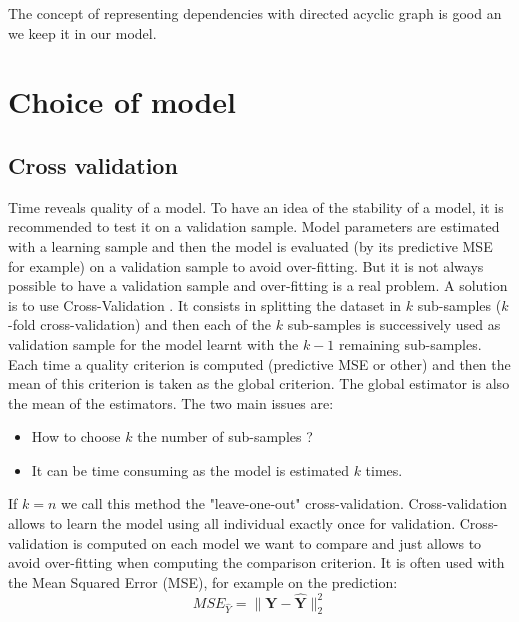 \documentclass[12pt,a4paper]{report}
\begin{document}
The concept of representing dependencies with directed acyclic graph is good an we keep it in our model.		
			
	

		\section{Choice of model}
			\subsection{Cross validation}
				
				Time reveals quality of a model. To have an idea of the stability of a model, it is recommended to test it on a validation sample. Model parameters are estimated with a learning sample and then the model is evaluated (by its predictive MSE for example) on a validation sample to avoid over-fitting. But it is not always possible to have a validation sample and over-fitting is a real problem. A solution is to use Cross-Validation \cite{kohavi1995study,arlot2010survey}. It consists in splitting the dataset in $k$ sub-samples ($k$-fold cross-validation) and then each of the $k$ sub-samples is successively used as validation sample for the model learnt with the $k-1$ remaining sub-samples. Each time a quality criterion  is computed (predictive MSE or other) and then the mean of this criterion is taken as the global criterion. The global estimator is also the mean of the estimators. The two main issues are:
				\begin{itemize}
					\item How to choose $k$ the number of sub-samples ?
					\item It can be time consuming as the model is estimated $k$ times.
				\end{itemize}
				If $k=n$ we call this method the "leave-one-out" cross-validation.
				Cross-validation allows to learn the model using all individual exactly once for validation.
				Cross-validation is computed on each model we want to compare and just allows to avoid over-fitting when computing the comparison criterion.
				It is often used with the Mean Squared Error (MSE), for example on the prediction:
				\begin{equation}
					MSE_{\hat{Y}}=\parallel \boldsymbol{Y}-\hat{\boldsymbol{Y}} \parallel^2_2
				\end{equation}
\end{document}
